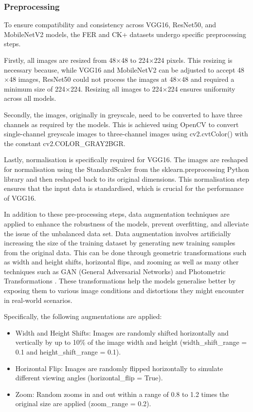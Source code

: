 \subsubsection{Preprocessing}

To ensure compatibility and consistency across VGG16, ResNet50, and MobileNetV2 models, the FER and CK+ datasets undergo specific preprocessing steps.

Firstly, all images are resized from 48\(\times\)48 to 224\(\times\)224 pixels. This resizing is necessary because, while VGG16 and MobileNetV2 can be adjusted to accept 48\(\times\)48 images, ResNet50 could not process the images at 48\(\times\)48 and required a minimum size of 224\(\times\)224. Resizing all images to 224\(\times\)224 ensures uniformity across all models.

Secondly, the images, originally in greyscale, need to be converted to have three channels as required by the models. This is achieved using OpenCV to convert single-channel greyscale images to three-channel images using cv2.cvtColor() with the constant cv2.COLOR\_GRAY2BGR.

Lastly, normalisation is specifically required for VGG16. The images are reshaped for normalisation using the StandardScaler from the sklearn.preprocessing Python library and then reshaped back to its original dimensions. This normalisation step ensures that the input data is standardised, which is crucial for the performance of VGG16.

In addition to these pre-processing steps, data augmentation techniques are applied to enhance the robustness of the models, prevent overfitting, and alleviate the issue of the unbalanced data set. Data augmentation involves artificially increasing the size of the training dataset by generating new training samples from the original data. This can be done through geometric transformations such as width and height shifts, horizontal flips, and zooming as well as many other techniques such as GAN (General Adversarial Networks) and Photometric Transformations \cite{Shorten2019-mj}. These transformations help the models generalise better by exposing them to various image conditions and distortions they might encounter in real-world scenarios.

Specifically, the following augmentations are applied:

\begin{itemize}
\item{} Width and Height Shifts: Images are randomly shifted horizontally and vertically by up to 10\% of the image width and height (width\_shift\_range = 0.1 and height\_shift\_range = 0.1).
\item{} Horizontal Flip: Images are randomly flipped horizontally to simulate different viewing angles (horizontal\_flip = True).
\item{} Zoom: Random zooms in and out within a range of 0.8 to 1.2 times the original size are applied (zoom\_range = 0.2).
\end{itemize}

